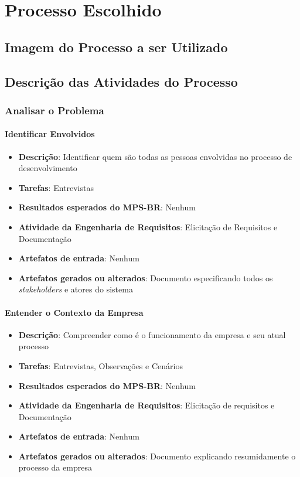 \chapter{Processo Escolhido}
\label{chosen-process}

\section{Imagem do Processo a ser Utilizado}

\section{Descrição das Atividades do Processo}

\subsection{Analisar o Problema}

\subsubsection{Identificar Envolvidos}

\begin{itemize}
\item \textbf{Descrição}: Identificar quem são todas as pessoas envolvidas no processo de desenvolvimento
\item \textbf{Tarefas}: Entrevistas
\item \textbf{Resultados esperados do MPS-BR}: Nenhum
\item \textbf{Atividade da Engenharia de Requisitos}: Elicitação de Requisitos e Documentação
\item \textbf{Artefatos de entrada}: Nenhum
\item \textbf{Artefatos gerados ou alterados}: Documento especificando todos os \textit{stakeholders} e atores do sistema
\end{itemize}

\subsubsection{Entender o Contexto da Empresa}

\begin{itemize}
\item \textbf{Descrição}: Compreender como é o funcionamento da empresa e seu atual processo
\item \textbf{Tarefas}: Entrevistas, Observações e Cenários
\item \textbf{Resultados esperados do MPS-BR}: Nenhum
\item \textbf{Atividade da Engenharia de Requisitos}: Elicitação de requisitos e Documentação
\item \textbf{Artefatos de entrada}: Nenhum
\item \textbf{Artefatos gerados ou alterados}: Documento explicando resumidamente o processo da empresa
\end{itemize}

